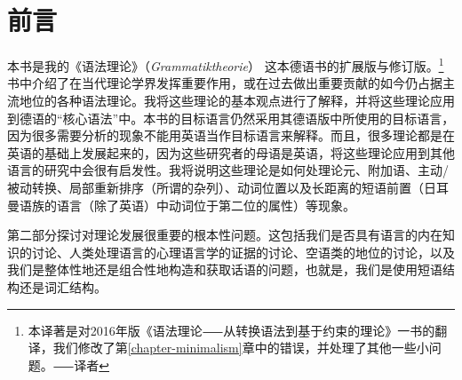 \chapter{前言}

\largerpage[-1]
本书是我的《语法理论》（\emph{Grammatiktheorie}） \citep{MuellerGTBuch2}这本德语书的扩展版与修订版。\footnote{
本译著是对2016年版《语法理论⸺从转换语法到基于约束的理论》一书的翻译，我们修改了第\ref{chapter-minimalism}章中的错误，并处理了其他一些小问题。⸺译者}
书中介绍了在当代理论学界发挥重要作用，或在过去做出重要贡献的如今仍占据主流地位的各种语法理论。我将这些理论的基本观点进行了解释，并将这些理论应用到德语的“核心语法”中。本书的目标语言仍然采用其德语版中所使用的目标语言，因为很多需要分析的现象不能用英语当作目标语言来解释。而且，很多理论都是在英语的基础上发展起来的，因为这些研究者的母语是英语，将这些理论应用到其他语言的研究中会很有启发性。我将说明这些理论是如何处理论元、附加语、主动/被动转换、局部重新排序（所谓的杂列）、动词位置以及长距离的短语前置（日耳曼语族的语言（除了英语）中动词位于第二位的属性）等现象。

第二部分探讨对理论发展很重要的根本性问题。这包括我们是否具有语言的内在知识的讨论、人类处理语言的心理语言学的证据的讨论、空语类的地位的讨论，以及我们是整体性地还是组合性地构造和获取话语的问题，也就是，我们是使用短语结构还是词汇结构。

